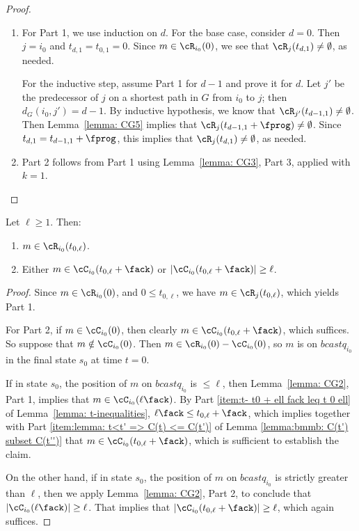 \begin{proof}
\begin{enumerate}
\item
For Part 1, we use induction on $d$.
For the base case, consider $d=0$.
Then $j = i_0$ and $t_{d,1} = t_{0,1} = 0$.
Since $m \in \cR_{i_0}(0)$, we see that $\cR_j(t_{d,1}) \neq \emptyset$,
as needed.

For the inductive step, assume Part 1 for $d-1$ and prove it
for $d$.
Let $j'$ be the predecessor of $j$ on a shortest path in $G$ from $i_0$ to
$j$; then $d_G(i_0,j') = d-1$.
By inductive hypothesis, we know that
$\cR_{j'}(t_{d-1,1}) \neq \emptyset$.
Then Lemma~\ref{lemma: CG5} implies that $\cR_j(t_{d-1,1} + \fprog) \neq
\emptyset$.
Since $t_{d,1} = t_{d-1,1} + \fprog$, this implies that
$\cR_j(t_{d,1}) \neq \emptyset$, as needed.

\item
Part 2 follows from Part 1 using Lemma~\ref{lemma: CG3}, Part 3,
applied with $k=1$.
\end{enumerate}
\end{proof}


\begin{lemma}
\label{lemma: d=0}
Let $\ell \geq 1$.
Then:
\begin{enumerate}
\item
$m \in \cR_{i_0}(t_{0,\ell})$.
\item
Either $m \in \cC_{i_0}(t_{0,\ell} + \fack)$ or $|\cC_{i_0}(t_{0,\ell} + \fack)| \geq \ell$.
\end{enumerate}
\end{lemma}

\begin{proof}
Since $m \in \cR_{i_0}(0)$, and $0 \leq t_{0,\ell}$, we have $m \in
\cR_j(t_{0,\ell})$, which yields Part 1.

For Part 2, if $m \in \cC_{i_0}(0)$, then clearly $m \in \cC_{i_0}(t_{0,\ell} + \fack)$, which suffices.
So suppose that $m \notin \cC_{i_0}(0)$.
Then $m \in \cR_{i_0}(0) - \cC_{i_0}(0)$, so $m$ is on $bcastq_{i_0}$
in the final state $s_0$ at time $t=0$.

If in state $s_0$, the position of $m$ on $bcastq_{i_0}$ is $\leq
\ell$, then Lemma~\ref{lemma: CG2}, Part 1, implies that
$m \in \cC_{i_0}(\ell \fack)$.
By Part \ref{item:t- t0 + ell fack leq t 0 ell} of Lemma~\ref{lemma: t-inequalities}, $ \ell \fack \leq t_{0,\ell} + \fack$,
which implies together with
Part \ref{item:lemma: t<t' => C(t) <= C(t')}
of Lemma \ref{lemma:bmmb: C(t') subset C(t'')}
that $m \in \cC_{i_0}(t_{0,\ell} + \fack)$,
which is sufficient to establish the claim.

On the other hand, if in state $s_0$, the position of $m$ on
$bcastq_{i_0}$ is strictly greater than $\ell$, then we apply
Lemma~\ref{lemma: CG2}, Part 2, to conclude that
$|\cC_{i_0}( \ell \fack)| \geq \ell$.
That implies that $|\cC_{i_0}(t_{0,\ell} + \fack)| \geq \ell$, which
again suffices.
\end{proof}


